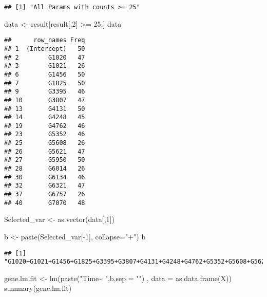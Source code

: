 \documentclass[
]{article}
\newenvironment{Shaded}{\begin{snugshade}}{\end{snugshade}}
\newcommand{\AttributeTok}[1]{\textcolor[rgb]{0.77,0.63,0.00}{#1}}
\newcommand{\DecValTok}[1]{\textcolor[rgb]{0.00,0.00,0.81}{#1}}
\newcommand{\FunctionTok}[1]{\textcolor[rgb]{0.00,0.00,0.00}{#1}}
\newcommand{\NormalTok}[1]{#1}
\newcommand{\OtherTok}[1]{\textcolor[rgb]{0.56,0.35,0.01}{#1}}
\newcommand{\SpecialCharTok}[1]{\textcolor[rgb]{0.00,0.00,0.00}{#1}}
\newcommand{\StringTok}[1]{\textcolor[rgb]{0.31,0.60,0.02}{#1}}
\begin{document}
\begin{verbatim}
## [1] "All Params with counts >= 25"
\end{verbatim}

\begin{Shaded}
\begin{Highlighting}[]
\NormalTok{data }\OtherTok{\textless{}{-}}\NormalTok{ result[result[,}\DecValTok{2}\NormalTok{] }\SpecialCharTok{\textgreater{}=} \DecValTok{25}\NormalTok{,] }
\NormalTok{data}
\end{Highlighting}
\end{Shaded}

\begin{verbatim}
##      row_names Freq
## 1  (Intercept)   50
## 2        G1020   47
## 3        G1021   26
## 6        G1456   50
## 7        G1825   50
## 9        G3395   46
## 10       G3807   47
## 13       G4131   50
## 14       G4248   45
## 19       G4762   46
## 23       G5352   46
## 25       G5608   26
## 26       G5621   47
## 27       G5950   50
## 28       G6014   26
## 30       G6134   46
## 32       G6321   47
## 37       G6757   26
## 40       G7070   48
\end{verbatim}

\begin{Shaded}
\begin{Highlighting}[]
\NormalTok{Selected\_var }\OtherTok{\textless{}{-}} \FunctionTok{as.vector}\NormalTok{(data[,}\DecValTok{1}\NormalTok{])}


\NormalTok{b }\OtherTok{\textless{}{-}} \FunctionTok{paste}\NormalTok{(Selected\_var[}\SpecialCharTok{{-}}\DecValTok{1}\NormalTok{], }\AttributeTok{collapse=}\StringTok{"+"}\NormalTok{)}
\NormalTok{b}
\end{Highlighting}
\end{Shaded}

\begin{verbatim}
## [1] "G1020+G1021+G1456+G1825+G3395+G3807+G4131+G4248+G4762+G5352+G5608+G5621+G5950+G6014+G6134+G6321+G6757+G7070"
\end{verbatim}

\begin{Shaded}
\begin{Highlighting}[]
\NormalTok{gene.lm.fit }\OtherTok{\textless{}{-}} \FunctionTok{lm}\NormalTok{(}\FunctionTok{paste}\NormalTok{(}\StringTok{"Time\textasciitilde{} "}\NormalTok{,b,}\AttributeTok{sep =} \StringTok{""}\NormalTok{)    , }\AttributeTok{data =} \FunctionTok{as.data.frame}\NormalTok{(X))}
\FunctionTok{summary}\NormalTok{(gene.lm.fit)}
\end{Highlighting}
\end{Shaded}
\end{document}
